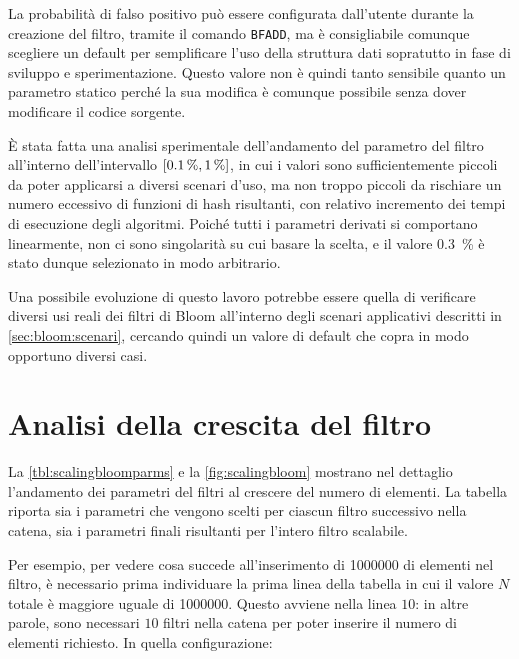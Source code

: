 La probabilità di falso positivo può essere configurata dall'utente durante la creazione del
filtro, tramite il comando \verb|BFADD|, ma è consigliabile comunque scegliere un default per
semplificare l'uso della struttura dati sopratutto in fase di sviluppo e sperimentazione. Questo
valore non è quindi tanto sensibile quanto un parametro statico perché la sua modifica è comunque
possibile senza dover modificare il codice sorgente.

È stata fatta una analisi sperimentale dell'andamento del parametro del filtro all'interno
dell'intervallo $\interval{\SI{0.1}{\%}}{\SI{1}{\%}}$, in cui i valori sono sufficientemente piccoli
da poter applicarsi a diversi scenari d'uso, ma non troppo piccoli da rischiare un numero eccessivo
di funzioni di hash risultanti, con relativo incremento dei tempi di esecuzione degli algoritmi.
Poiché tutti i parametri derivati si comportano linearmente, non ci sono singolarità su cui basare
la scelta, e il valore \SI{0.3}{\%} è stato dunque selezionato in modo arbitrario.

Una possibile evoluzione di questo lavoro potrebbe essere quella di verificare diversi usi reali
dei filtri di Bloom all'interno degli scenari applicativi descritti in \autoref{sec:bloom:scenari}, 
cercando quindi un valore di default che copra in modo opportuno diversi casi.

\section{Analisi della crescita del filtro}

La \autoref{tbl:scalingbloomparms} e la \autoref{fig:scalingbloom} mostrano nel dettaglio
l'andamento dei parametri del filtri al crescere del numero di elementi. La tabella riporta sia i
parametri che vengono scelti per ciascun filtro successivo nella catena, sia i parametri finali
risultanti per l'intero filtro scalabile.

Per esempio, per vedere cosa succede all'inserimento di \num{1000000} di elementi nel filtro,
è necessario prima individuare la prima linea della tabella in cui il valore $N$ totale è maggiore
uguale di \num{1000000}. Questo avviene nella linea $10$: in altre parole, sono necessari $10$
filtri nella catena per poter inserire il numero di elementi richiesto. In quella configurazione:

